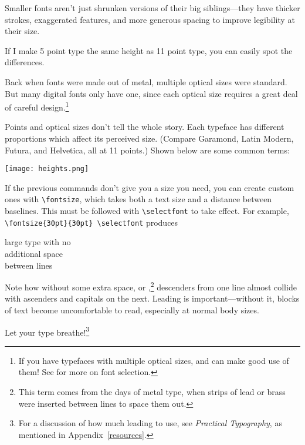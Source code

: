 Smaller fonts aren't just shrunken versions of their big siblings---they
have thicker strokes, exaggerated features,
and more generous spacing to improve legibility at their size.
\begin{leftfigure}
 If I make 5 point type
\lm the same height as 11 point type,
you can easily spot the differences.
\end{leftfigure}
Back when fonts were made out of metal, multiple optical sizes were standard.
But many digital fonts only have one,
since each optical size requires a great deal of careful
design.\punckern\footnote{If you have typefaces with multiple optical sizes,
\LuaLaTeX{} and \XeLaTeX{} can make good use of them!
See  for more on font selection.}

Points and optical sizes don't tell the whole story.
Each typeface has different proportions which affect its perceived size.
(Compare Garamond, { Latin Modern},
{Futura},
and {Helvetica}, all at 11 points.)
Shown below are some common terms:
\begin{centerfigure}
\texttt{[image: heights.png]}

\end{centerfigure}

If the previous commands don't give you a size you need,
you can create custom ones with \verb|\fontsize|,
which takes both a text size and a
distance between baselines.
This must be followed with \verb|\selectfont| to take effect.
For example, \texttt{\textbackslash fontsize\{30pt\}\allowbreak\{30pt\}%
\allowbreak\textbackslash selectfont}
produces
\begin{leftfigure}
\lm
\fontsize{30pt}{30pt}\selectfont
large type with no \\
additional space \\
between lines
\end{leftfigure}
{\fontsize{11pt}{11pt}\selectfont
Note how without some extra space,
or ,\punckern\footnote{This term comes from the days of
metal type, when strips of lead or brass were inserted
between lines to space them out.\punckern{}}
descenders from one line almost collide with ascenders and capitals on
the next.
Leading is important---without it, blocks of text become uncomfortable to
read, especially at normal body sizes.\par}
Let your type breathe!\footnote{For a discussion of how much leading
to use, see \textit{Practical Typography},
as mentioned in Appendix~\ref{resources}.}

